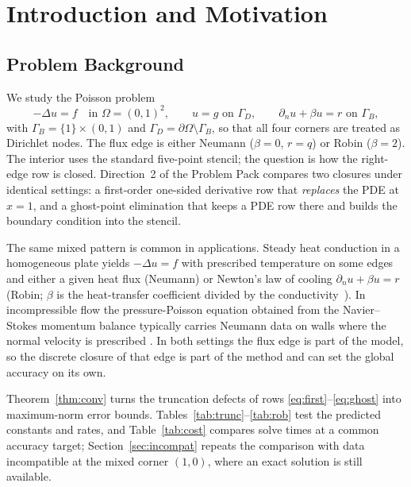 \documentclass[11pt,a4paper]{article}
\theoremstyle{palplain}
\theoremstyle{paldef}
\theoremstyle{palremark}
\newcommand{\GD}{\Gamma_D}
\newcommand{\GB}{\Gamma_B}
\begin{document}
\section{Introduction and Motivation}
\subsection{Problem Background}
We study the Poisson problem
\[
-\Delta u=f\quad\text{in }\Omega=(0,1)^2,\qquad
u=g\text{ on }\GD,\qquad
\partial_n u+\beta u=r\text{ on }\GB,
\]
with $\GB=\{1\}\times(0,1)$ and $\GD=\partial\Omega\setminus\GB$, so that all four corners
are treated as Dirichlet nodes. The flux edge is either Neumann ($\beta=0$, $r=q$) or Robin
($\beta=2$). The interior uses the standard five-point stencil; the question is how the
right-edge row is closed. Direction~2 of the Problem Pack compares two closures under identical
settings: a first-order one-sided derivative row that \emph{replaces} the PDE at $x=1$, and a
ghost-point elimination that keeps a PDE row there and builds the boundary condition into the
stencil.

The same mixed pattern is common in applications. Steady heat conduction in a homogeneous
plate yields $-\Delta u=f$ with prescribed temperature on some edges and either a given
heat flux (Neumann) or Newton's law of cooling $\partial_n u+\beta u=r$ (Robin; $\beta$ is the
heat-transfer coefficient divided by the conductivity~\cite{incropera}). In incompressible flow the pressure-Poisson equation obtained from the Navier--Stokes momentum
balance typically carries Neumann data on walls where the normal velocity is prescribed
\cite{gresho}. In both settings the flux edge is part of the model, so the discrete
closure of that edge is part of the method and can set the global accuracy on its own.

Theorem~\ref{thm:conv} turns the truncation defects of rows \eqref{eq:first}--\eqref{eq:ghost}
into maximum-norm error bounds. Tables~\ref{tab:trunc}--\ref{tab:rob} test the predicted
constants and rates, and Table~\ref{tab:cost} compares solve times at a common accuracy target;
Section~\ref{sec:incompat} repeats the comparison with data incompatible at the mixed corner
$(1,0)$, where an exact solution is still available.
\end{document}
